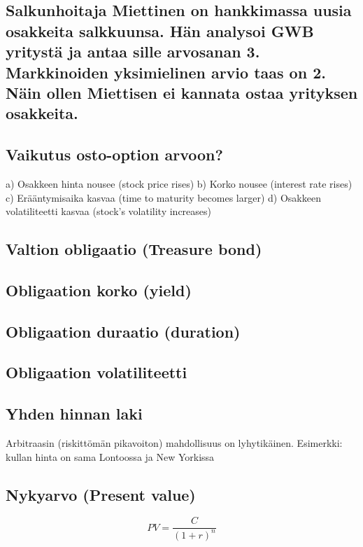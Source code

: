 \documentclass[a4paper]{article}
\begin{document}
\subsection{Salkunhoitaja Miettinen on hankkimassa uusia osakkeita salkkuunsa. Hän analysoi GWB yritystä ja antaa sille arvosanan 3. Markkinoiden yksimielinen arvio taas on 2. Näin ollen Miettisen ei kannata ostaa yrityksen osakkeita.}

\subsection{Vaikutus osto-option arvoon?}
a) Osakkeen hinta nousee (stock price rises)
b) Korko nousee (interest rate rises)
c) Erääntymisaika kasvaa (time to maturity becomes larger)
d) Osakkeen volatiliteetti kasvaa (stock's volatility increases)

\subsection{Valtion obligaatio (Treasure bond)}

\subsection{Obligaation korko (yield)}

\subsection{Obligaation duraatio (duration)}

\subsection{Obligaation volatiliteetti}


\subsection{Yhden hinnan laki}

Arbitraasin (riskittömän pikavoiton) mahdollisuus on lyhytikäinen.
Esimerkki: kullan hinta on sama Lontoossa ja New Yorkissa

\subsection{Nykyarvo (Present value)}

\[
PV = \frac{C}{(1 + r)^n}
\]
\end{document}
